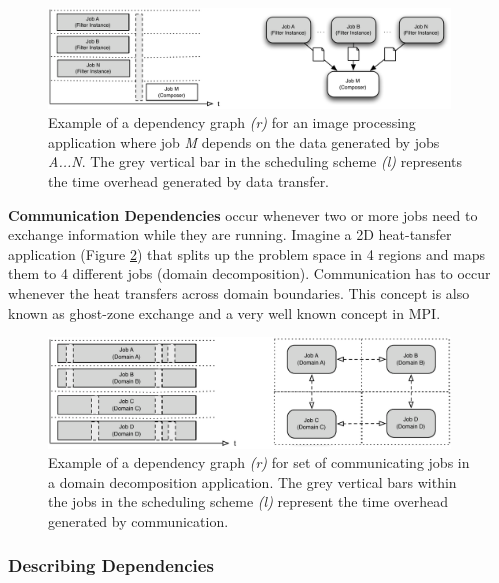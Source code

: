     \begin{figure}[bth!]
    \begin{center}
      \includegraphics[width=0.95\textwidth]{../figures/data_dependencies}
      \caption{\label{fig:data_dependencies} Example of a dependency graph \textit{(r)} for an image processing application where job \textit{M} depends on the data generated by jobs \textit{A...N}. The grey vertical bar in the scheduling scheme \textit{(l)} represents the time overhead generated by data transfer.}
    \end{center}
  \end{figure}


\textbf{Communication Dependencies} occur whenever two or more jobs need to exchange information while they are running. Imagine a 2D heat-tansfer application (Figure \ref{fig:comm_dependencies}) that splits up the problem space in 4 regions and maps them to 4 different jobs (domain decomposition). Communication has to occur whenever the heat transfers across domain boundaries. This concept is also known as ghost-zone exchange and a very well known concept in MPI.

    \begin{figure}[h]
    \begin{center}
      \includegraphics[width=0.95\textwidth]{../figures/comm_dependencies}
      \caption{\label{fig:comm_dependencies} Example of a dependency graph \textit{(r)} for set of communicating jobs in a domain decomposition application. The grey vertical bars within the jobs in the scheduling scheme \textit{(l)} represent the time overhead generated by communication.}
    \end{center}
  \end{figure}

\subsubsection{Describing Dependencies}

